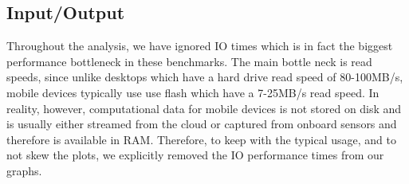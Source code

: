 \subsection{Input/Output}

Throughout the analysis, we have ignored IO times which is in fact the biggest
performance bottleneck in these benchmarks.
The main bottle neck is read speeds, since unlike desktops which have a hard
drive read speed of 80-100MB/s, mobile devices typically use use flash which
have a 7-25MB/s read speed.
In reality, however, computational data for mobile devices is not stored on
disk and is usually either streamed from the cloud or captured from onboard
sensors and therefore is available in RAM.
Therefore, to keep with the typical usage, and to not skew the plots, we
explicitly removed the IO performance times from our graphs.

